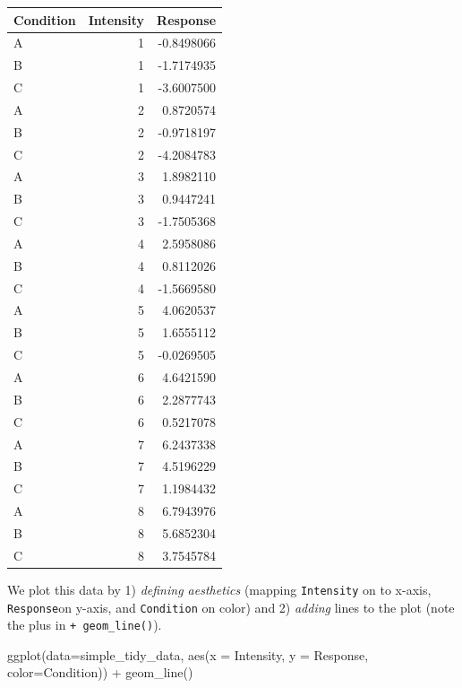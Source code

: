 \documentclass[
]{book}
\newenvironment{Shaded}{\begin{snugshade}}{\end{snugshade}}
\newcommand{\AttributeTok}[1]{\textcolor[rgb]{0.77,0.63,0.00}{#1}}
\newcommand{\FunctionTok}[1]{\textcolor[rgb]{0.00,0.00,0.00}{#1}}
\newcommand{\NormalTok}[1]{#1}
\newcommand{\SpecialCharTok}[1]{\textcolor[rgb]{0.00,0.00,0.00}{#1}}
\begin{document}
\begin{tabular}{l|r|r}
\hline
Condition & Intensity & Response\\
\hline
A & 1 & -0.8498066\\
\hline
B & 1 & -1.7174935\\
\hline
C & 1 & -3.6007500\\
\hline
A & 2 & 0.8720574\\
\hline
B & 2 & -0.9718197\\
\hline
C & 2 & -4.2084783\\
\hline
A & 3 & 1.8982110\\
\hline
B & 3 & 0.9447241\\
\hline
C & 3 & -1.7505368\\
\hline
A & 4 & 2.5958086\\
\hline
B & 4 & 0.8112026\\
\hline
C & 4 & -1.5669580\\
\hline
A & 5 & 4.0620537\\
\hline
B & 5 & 1.6555112\\
\hline
C & 5 & -0.0269505\\
\hline
A & 6 & 4.6421590\\
\hline
B & 6 & 2.2877743\\
\hline
C & 6 & 0.5217078\\
\hline
A & 7 & 6.2437338\\
\hline
B & 7 & 4.5196229\\
\hline
C & 7 & 1.1984432\\
\hline
A & 8 & 6.7943976\\
\hline
B & 8 & 5.6852304\\
\hline
C & 8 & 3.7545784\\
\hline
\end{tabular}

We plot this data by 1) \emph{defining aesthetics} (mapping \texttt{Intensity} on to x-axis, \texttt{Response}on y-axis, and \texttt{Condition} on color) and 2) \emph{adding} lines to the plot (note the plus in \texttt{+\ geom\_line()}).

\begin{Shaded}
\begin{Highlighting}[]
\FunctionTok{ggplot}\NormalTok{(}\AttributeTok{data=}\NormalTok{simple\_tidy\_data, }\FunctionTok{aes}\NormalTok{(}\AttributeTok{x =}\NormalTok{ Intensity, }\AttributeTok{y =}\NormalTok{ Response, }\AttributeTok{color=}\NormalTok{Condition)) }\SpecialCharTok{+} 
  \FunctionTok{geom\_line}\NormalTok{()}
\end{Highlighting}
\end{Shaded}
\end{document}
